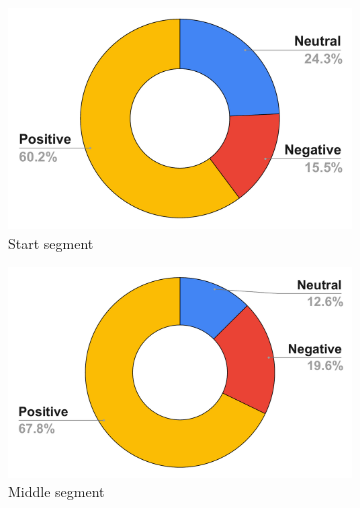 \begin{figure}
\begin{subfigure}{.33\textwidth}
  \centering
  \includegraphics[width=.8\linewidth]{figures/start_tone_majority.pdf}
  \caption{Start segment}
  \label{start_tone}
\end{subfigure}%
\begin{subfigure}{.33\textwidth}
  \centering
  \includegraphics[width=.8\linewidth]{figures/middle_tone_majority.pdf}
  \caption{Middle segment}
  \label{mid_tone}
\end{subfigure}
\begin{subfigure}{.33\textwidth}

\end{subfigure}
\end{figure}
